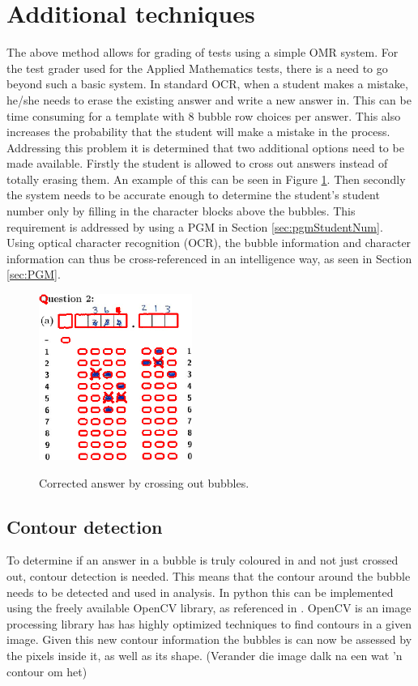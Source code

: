 \section{Additional techniques}
The above method allows for grading of tests using a simple OMR system. For the test grader used for the Applied Mathematics tests, there is a need to go beyond such a basic system.  In standard OCR, when a student makes a mistake, he/she needs to erase the existing answer and write a new answer in. This can be time consuming for a template with 8 bubble row choices per answer. This also increases the probability that the student will make a mistake in the process. Addressing this problem it is determined that two additional options need to be made available. Firstly the student is allowed to cross out answers instead of totally erasing them. An example of this can be seen in Figure \ref{fig:Cross}. Then secondly the system needs to be accurate enough to determine the student's student number only by filling in the character blocks above the bubbles. This requirement is addressed by using a PGM in Section \ref{sec:pgmStudentNum}. Using optical character recognition (OCR), the bubble information and character information can thus be cross-referenced in an intelligence way, as seen in Section \ref{sec:PGM}.

\begin{figure}
  \centering
  \includegraphics[width=5cm]{Cross}\\
  \caption{Corrected answer by crossing out bubbles.}
  \label{fig:Cross}
\end{figure}

\subsection{Contour detection}
To determine if an answer in a bubble is truly coloured in and not just crossed out, contour detection is needed. This means that the contour around the bubble needs to be detected and used in analysis. In python this can be implemented using the freely available OpenCV library, as referenced in \citet{AdrianR2016}. OpenCV is an image processing library has has highly optimized techniques to find contours in a given image. Given this new contour information the bubbles is can now be assessed by the pixels inside it, as well as its shape. (Verander die image dalk na een wat 'n contour om het)

